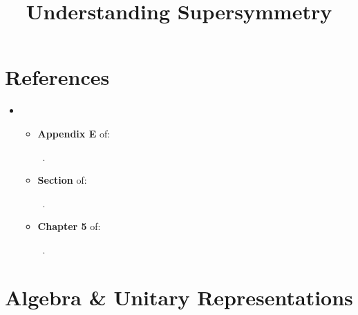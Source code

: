 \documentclass[a4paper
	,10pt
]{article}
\title{Understanding Supersymmetry}
\begin{document}
\maketitle
{}
\thispagestyle{empty}


\setlength{\parskip}{.1\baselineskip}
\tableofcontents
\setlength{\parskip}{\parskipnorm}

\addtocounter{section}{-1}
\section{References}
\raggedright
	\begin{itemize}
	\item \cite{Atanasov:2017abc}~
		\begin{itemize}
		\item \textbf{Appendix E} of: \par
		\cite{Belavin:1984vu}~.
		
		\item \textbf{Section } of: \par
		\cite{Kogut:1979wt}~.
		
		\item \textbf{Chapter 5} of:\par
		\cite{Fradkin:1991nr}~.
		
		\end{itemize}
	\end{itemize}
\justifying

\section{Algebra \& Unitary Representations}
	
	
	
	
	
\vspace{1.2\baselineskip}
\pagebreak[4]
\raggedright
\printbibliography[%
	,heading = bibintoc
]
\end{document}

